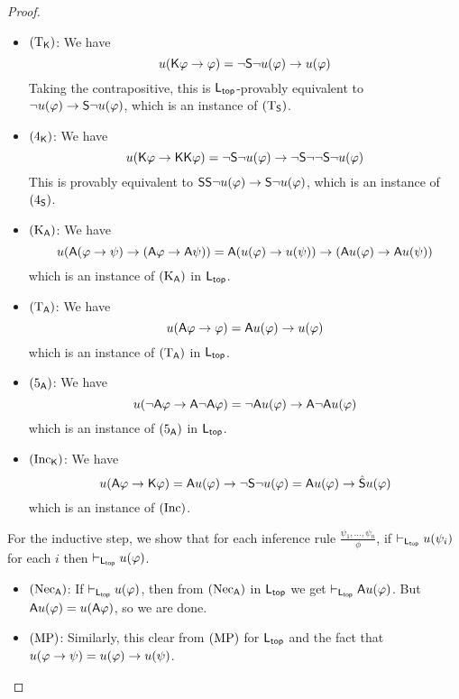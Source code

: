 \begin{proof}
\begin{claimproof}
\begin{itemize}
        \item $(\text{T}_{\mathsf{K}})$: We have
        \[
        u(\mathsf{K}\varphi \to \varphi)
= \neg\mathsf{S}\neg u(\varphi) \to u(\varphi)\]
        Taking the contrapositive, this is $\mathsf{L}_{\mathsf{top}}$-provably
equivalent to $\neg u(\varphi) \to \mathsf{S}\neg u(\varphi)$, which
is an instance of $(\text{T}_{\mathsf{S}})$.

        \item $(\text{4}_{\mathsf{K}})$: We have
        \[
        u(\mathsf{K}\varphi \to \mathsf{K}\mathsf{K}\varphi)
= \neg\mathsf{S}\neg u(\varphi) \to \neg\mathsf{S}\neg\neg\mathsf{S}\neg u(\varphi)\]
        This is provably equivalent to $\mathsf{S}\mathsf{S}\neg u(\varphi) \to
\mathsf{S}\neg u(\varphi)$, which is an instance of $(\text{4}_{\mathsf{S}})$.

        \item $(\text{K}_{\mathsf{A}})$: We have
        \[
        u(\mathsf{A}(\varphi \to \psi) \to (\mathsf{A}\varphi \to \mathsf{A}\psi))
=
\mathsf{A} (u(\varphi) \to u(\psi)) \to (\mathsf{A} u(\varphi) \to \mathsf{A} u(\psi))\]
        which is an instance of $(\text{K}_{\mathsf{A}})$ in $\mathsf{L}_{\mathsf{top}}$.

        \item $(\text{T}_{\mathsf{A}})$: We have
        \[
        u(\mathsf{A}\varphi \to \varphi)
=
\mathsf{A} u(\varphi) \to u(\varphi)\]
        which is an instance of $(\text{T}_{\mathsf{A}})$ in $\mathsf{L}_{\mathsf{top}}$.

        \item $(\text{5}_{\mathsf{A}})$: We have
        \[
        u(\neg\mathsf{A}\varphi \to \mathsf{A}\neg\mathsf{A}\varphi)
=
\neg\mathsf{A} u(\varphi) \to \mathsf{A} \neg\mathsf{A} u(\varphi)\]
        which is an instance of $(\text{5}_{\mathsf{A}})$ in $\mathsf{L}_{\mathsf{top}}$.

        \item $(\text{Inc}_{\mathsf{K}})$: We have
        \[
        u(\mathsf{A}\varphi \to \mathsf{K}\varphi)
=
\mathsf{A} u(\varphi) \to \neg\mathsf{S}\neg u(\varphi)
=
\mathsf{A} u(\varphi) \to \hat{\mathsf{S}} u(\varphi)\]
        which is an instance of $(\text{Inc})$.

        \end{itemize}
    For the inductive step, we show that for each inference rule
$\frac{\psi_1,\ldots,\psi_n}{\phi}$, if
$\vdash_{\mathsf{L}_{\mathsf{top}}}u(\psi_i)$ for each $i$ then
$\vdash_{\mathsf{L}_{\mathsf{top}}}u(\varphi)$.

    \begin{itemize}
    \item $(\text{Nec}_{\mathsf{A}})$: If $\vdash_{\mathsf{L}_{\mathsf{top}}} u(\varphi)$, then from
$(\text{Nec}_{\mathsf{A}})$ in $\mathsf{L}_{\mathsf{top}}$ we get
$\vdash_{\mathsf{L}_{\mathsf{top}}} \mathsf{A} u(\varphi)$. But $\mathsf{A} u(\varphi) =
u(\mathsf{A}\varphi)$, so we are done.

        \item $(\text{MP})$: Similarly, this clear from $(\text{MP})$ for
$\mathsf{L}_{\mathsf{top}}$ and the fact that $u(\varphi \to \psi) =
u(\varphi) \to u(\psi)$.
        \end{itemize}
    \end{claimproof}


\end{proof}
